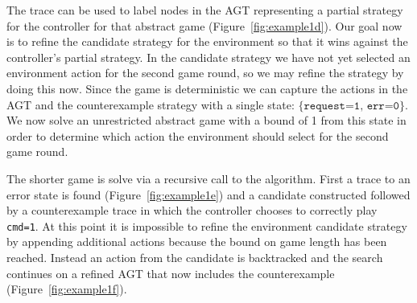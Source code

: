 The trace can be used to label nodes in the AGT representing a partial strategy for the controller for that abstract game (Figure~\ref{fig:example1d}). Our goal now is to refine the candidate strategy for the environment so that it wins against the controller's partial strategy. In the candidate strategy we have not yet selected an environment action for the second game round, so we may refine the strategy by doing this now. Since the game is deterministic we can capture the actions in the AGT and the counterexample strategy with a single state: $\{ \texttt{request=1, err=0} \}$. We now solve an unrestricted abstract game with a bound of 1 from this state in order to determine which action the environment should select for the second game round. 

The shorter game is solve via a recursive call to the algorithm. First a trace to an error state is found (Figure~\ref{fig:example1e}) and a candidate constructed followed by a counterexample trace in which the controller chooses to correctly play \texttt{cmd=1}. At this point it is impossible to refine the environment candidate strategy by appending additional actions because the bound on game length has been reached. Instead an action from the candidate is backtracked and the search continues on a refined AGT that now includes the counterexample (Figure~\ref{fig:example1f}).


